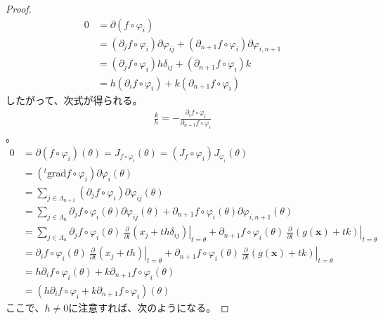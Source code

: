 \documentclass[dvipdfmx]{jsarticle}
\begin{document}
\begin{proof}
{\begin{align*}
0 &= \partial \left( f\circ \varphi_{i} \right) \\
&= \left( \partial_{j} f \circ \varphi_{i} \right) \partial \varphi_{ij} + \left( \partial_{n+1} f \circ \varphi_{i} \right) \partial \varphi_{i,n+1} \\
&= \left( \partial_{j} f \circ \varphi_{i} \right) h \delta_{ij} + \left( \partial_{n+1} f \circ \varphi_{i} \right) k\\
&= h \left( \partial_{i} f \circ \varphi_{i} \right) + k \left( \partial_{n+1} f \circ \varphi_{i} \right) 
\end{align*} 
したがって、次式が得られる。
\begin{align*}
\frac{k}{h} = - \frac{\partial_{i} f \circ \varphi_{i} }{\partial_{n+1} f \circ \varphi_{i} }
\end{align*} }。
\begin{align*}
0 &= \partial(f \circ \varphi_{i})(\theta) = J_{f \circ \varphi_{i}}(\theta) = \left( J_{f} \circ \varphi_{i} \right)J_{\varphi_{i}}(\theta)\\
&= \left({}^{t}\mathrm{grad}f \circ \varphi_{i} \right)\partial\varphi_{i}(\theta)\\
&= \sum_{j \in \varLambda_{n + 1}} {\left( \partial_{j}f \circ \varphi_{i} \right)\partial\varphi_{ij}(\theta)}\\
&= \sum_{j \in \varLambda_{n}} {\partial_{j}f \circ \varphi_{i}(\theta)\partial\varphi_{ij}(\theta)} + \partial_{n + 1}f \circ \varphi_{i}(\theta)\partial\varphi_{i,n + 1}(\theta)\\
&= \sum_{j \in \varLambda_{n}} {\partial_{j}f \circ \varphi_{i}(\theta)\left. \ \frac{\partial}{\partial t}\left( x_{j} + th\delta_{ij} \right) \right|_{t = \theta}} + \partial_{n + 1}f \circ \varphi_{i}(\theta)\left. \ \frac{\partial}{\partial t}\left( g\left( \mathbf{x} \right) + tk \right) \right|_{t = \theta}\\
&= \partial_{i}f \circ \varphi_{i}(\theta)\left. \ \frac{\partial}{\partial t}\left( x_{j} + th \right) \right|_{t = \theta} + \partial_{n + 1}f \circ \varphi_{i}(\theta)\left. \ \frac{\partial}{\partial t}\left( g\left( \mathbf{x} \right) + tk \right) \right|_{t = \theta}\\
&= h\partial_{i}f \circ \varphi_{i}(\theta) + k\partial_{n + 1}f \circ \varphi_{i}(\theta)\\
&= \left( h\partial_{i}f \circ \varphi_{i} + k\partial_{n + 1}f \circ \varphi_{i} \right)(\theta)
\end{align*}
ここで、$h \neq 0$に注意すれば、次のようになる。

\end{proof}
\end{document}
